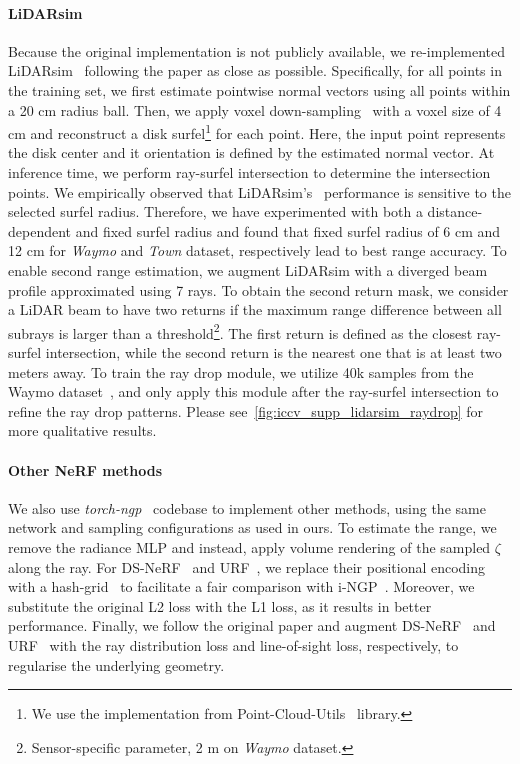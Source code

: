 \paragraph{LiDARsim}
Because the original implementation is not publicly available, we re-implemented LiDARsim~\cite{manivasagam2020lidarsim} following the paper as close as possible. Specifically, for all points in the training set, we first estimate pointwise normal vectors using all points within a 20 cm radius ball. Then, we apply voxel down-sampling~\cite{tang2022torchsparse} with a voxel size of 4 cm and reconstruct a disk surfel\footnote{We use the implementation from Point-Cloud-Utils~\cite{point-cloud-utils} library.} for each point. Here, the input point represents the disk center and it orientation is defined by the estimated normal vector. At inference time, we perform ray-surfel intersection to determine the intersection points. We empirically observed that LiDARsim's~\cite{manivasagam2020lidarsim} performance is sensitive to the selected surfel radius. Therefore, we have experimented with both a distance-dependent and fixed surfel radius and found that fixed surfel radius of 6 cm and 12 cm for \textit{Waymo} and \textit{Town} dataset, respectively lead to best range accuracy. To enable second range estimation, we augment LiDARsim with a diverged beam profile approximated using 7 rays. To obtain the second return mask, we consider a LiDAR beam to have two returns if the maximum range difference between all subrays is larger than a threshold\footnote{Sensor-specific parameter, 2 m on \textit{Waymo} dataset.}. The first return is defined as the closest ray-surfel intersection, while the second return is the nearest one that is at least two meters away. To train the ray drop module, we utilize 40k samples from the Waymo dataset~\cite{sun2020scalability}, and only apply this module after the ray-surfel intersection to refine the ray drop patterns. Please see~\cref{fig:iccv_supp_lidarsim_raydrop} for more qualitative results. 


\paragraph{Other NeRF methods}
We also use \emph{torch-ngp}~\cite{torch-ngp} codebase to implement other methods, using the same network and sampling configurations as used in ours. To estimate the range, we remove the radiance MLP and instead, apply volume rendering of the sampled $\zeta$ along the ray.  For DS-NeRF~\cite{deng2021depth} and URF~\cite{rematas2021urban}, we replace their positional encoding with a hash-grid~\cite{mueller2022instant} to facilitate a fair comparison with i-NGP~\cite{mueller2022instant}. Moreover, we substitute the original L2 loss with the L1 loss, as it results in better performance. Finally, we follow the original paper and augment DS-NeRF~\cite{deng2021depth} and URF~\cite{rematas2021urban} with the ray distribution loss and line-of-sight loss, respectively, to regularise the underlying geometry. 



